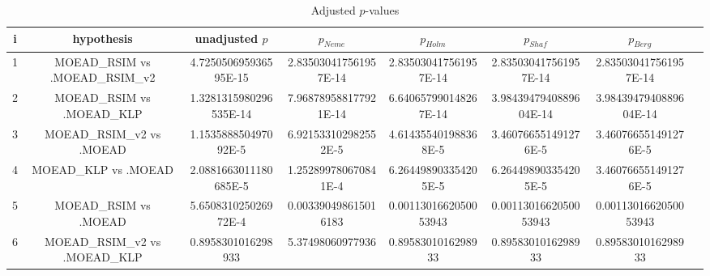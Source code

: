 \documentclass[a4paper,10pt]{article}
\begin{document}
\begin{landscape}
\begin{table}[!htp]
\centering\tiny
\caption{Adjusted $p$-values}
\begin{tabular}{cccccccc}
i&hypothesis&unadjusted $p$&$p_{Neme}$&$p_{Holm}$&$p_{Shaf}$&$p_{Berg}$\\
\hline
1&MOEAD_RSIM vs .MOEAD_RSIM_v2&4.725050695936595E-15&2.835030417561957E-14&2.835030417561957E-14&2.835030417561957E-14&2.835030417561957E-14\\
2&MOEAD_RSIM vs .MOEAD_KLP&1.3281315980296535E-14&7.968789588177921E-14&6.640657990148267E-14&3.9843947940889604E-14&3.9843947940889604E-14\\
3&MOEAD_RSIM_v2 vs .MOEAD&1.153588850497092E-5&6.921533102982552E-5&4.614355401988368E-5&3.460766551491276E-5&3.460766551491276E-5\\
4&MOEAD_KLP vs .MOEAD&2.0881663011180685E-5&1.252899780670841E-4&6.264498903354205E-5&6.264498903354205E-5&3.460766551491276E-5\\
5&MOEAD_RSIM vs .MOEAD&5.650831025026972E-4&0.003390498615016183&0.0011301662050053943&0.0011301662050053943&0.0011301662050053943\\
6&MOEAD_RSIM_v2 vs .MOEAD_KLP&0.8958301016298933&5.37498060977936&0.8958301016298933&0.8958301016298933&0.8958301016298933\\
\hline
\end{tabular}
\end{table}

\end{landscape}
\end{document}

